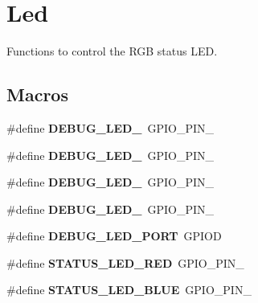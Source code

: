 \hypertarget{group__led}{}\section{Led}
\label{group__led}


Functions to control the R\+G\+B status L\+E\+D.  


\subsection*{Macros}
\begin{DoxyCompactItemize}
\item 
\hypertarget{group__led_ga68ed294bc891b4742a1d1da71bda1eb9}{}\#define {\bfseries D\+E\+B\+U\+G\+\_\+\+L\+E\+D\+\_}~G\+P\+I\+O\+\_\+\+P\+I\+N\+\_\label{group__led_ga68ed294bc891b4742a1d1da71bda1eb9}

\item 
\hypertarget{group__led_gadfdf63841cc6d44d8014c77db9d505cb}{}\#define {\bfseries D\+E\+B\+U\+G\+\_\+\+L\+E\+D\+\_}~G\+P\+I\+O\+\_\+\+P\+I\+N\+\_\label{group__led_gadfdf63841cc6d44d8014c77db9d505cb}

\item 
\hypertarget{group__led_ga0e9eba4222e9af8fbdf3ddafc605f1e1}{}\#define {\bfseries D\+E\+B\+U\+G\+\_\+\+L\+E\+D\+\_}~G\+P\+I\+O\+\_\+\+P\+I\+N\+\_\label{group__led_ga0e9eba4222e9af8fbdf3ddafc605f1e1}

\item 
\hypertarget{group__led_ga39a81b44f4a929468e0028a585d5040a}{}\#define {\bfseries D\+E\+B\+U\+G\+\_\+\+L\+E\+D\+\_}~G\+P\+I\+O\+\_\+\+P\+I\+N\+\_\label{group__led_ga39a81b44f4a929468e0028a585d5040a}

\item 
\hypertarget{group__led_gab64cab773c6198b8ef349d26b49a2f5f}{}\#define {\bfseries D\+E\+B\+U\+G\+\_\+\+L\+E\+D\+\_\+\+P\+O\+R\+T}~G\+P\+I\+O\+D\label{group__led_gab64cab773c6198b8ef349d26b49a2f5f}

\item 
\hypertarget{group__led_ga9639a48c211663cf73f0d22f93fa8e9e}{}\#define {\bfseries S\+T\+A\+T\+U\+S\+\_\+\+L\+E\+D\+\_\+\+R\+E\+D}~G\+P\+I\+O\+\_\+\+P\+I\+N\+\_\label{group__led_ga9639a48c211663cf73f0d22f93fa8e9e}

\item 
\hypertarget{group__led_ga09bc6fffa97eb296120970259b34f837}{}\#define {\bfseries S\+T\+A\+T\+U\+S\+\_\+\+L\+E\+D\+\_\+\+B\+L\+U\+E}~G\+P\+I\+O\+\_\+\+P\+I\+N\+\_\label{group__led_ga09bc6fffa97eb296120970259b34f837}


\end{DoxyCompactItemize}
